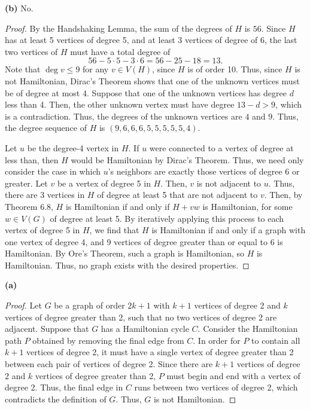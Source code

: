 \documentclass[12pt]{article}
\begin{document}
	{\bf (b)} No.
	\begin{proof}
		By the Handshaking Lemma, the sum of the degrees of $H$ is $56$.
		Since $H$ has at least 5 vertices of degree 5, and at least 3 vertices of degree of 6, the last two vertices of $H$ must have a total degree of $$56 - 5 \cdot 5 - 3 \cdot 6 = 56 - 25 - 18 = 13.$$
    		Note that $\deg v \leq 9$ for any $v \in V(H)$, since $H$ is of order 10.
    		Thus, since $H$ is not Hamiltonian, Dirac's Theorem shows that one of the unknown vertices must be of degree at most $4$.
		Suppose that one of the unknown vertices has degree $d$ less than 4.
		Then, the other unknown vertex must have degree $13 - d > 9$, which is a contradiction.
		Thus, the degrees of the unknown vertices are $4$ and $9$.
		Thus, the degree sequence of $H$ is $(9, 6, 6, 6, 5, 5, 5, 5, 5, 4)$.
    
		Let $u$ be the degree-4 vertex in $H$.
		If $u$ were connected to a vertex of degree at less than, then $H$ would be Hamiltonian by Dirac's Theorem.
		Thus, we need only consider the case in which $u$'s neighbors are exactly those vertices of degree 6 or greater.
		Let $v$ be a vertex of degree 5 in $H$.
		Then, $v$ is not adjacent to $u$.
		Thus, there are 3 vertices in $H$ of degree at least 5 that are not adjacent to $v$.
		Then, by Theorem 6.8, $H$ is Hamiltonian if and only if $H+vw$ is Hamiltonian, for some $w \in V(G)$ of degree at least 5.
		By iteratively applying this process to each vertex of degree 5 in $H$, we find that $H$ is Hamiltonian if and only if a graph with one vertex of degree 4, and 9 vertices of degree greater than or equal to 6 is Hamiltonian.
		By Ore's Theorem, such a graph is Hamiltonian, so $H$ is Hamiltonian.
		Thus, no graph exists with the desired properties.
	\end{proof}
\newpage{}
    {\bf (a)}
    \begin{proof}
	Let $G$ be a graph of order $2k+1$ with $k+1$ vertices of degree 2 and $k$ vertices of degree greater than 2, such that no two vertices of degree 2 are adjacent.
	Suppose that $G$ has a Hamiltonian cycle $C$.
	Consider the Hamiltonian path $P$ obtained by removing the final edge from $C$.
	In order for $P$ to contain all $k+1$ vertices of degree 2, it must have a single vertex of degree greater than 2 between each pair of vertices of degree 2.
	Since there are $k+1$ vertices of degree 2 and $k$ vertices of degree greater than 2, $P$ must begin and end with a vertex of degree 2.
	Thus, the final edge in $C$ runs between two vertices of degree 2, which contradicts the definition of $G$.
	Thus, $G$ is not Hamiltonian.
    \end{proof}
\end{document}
